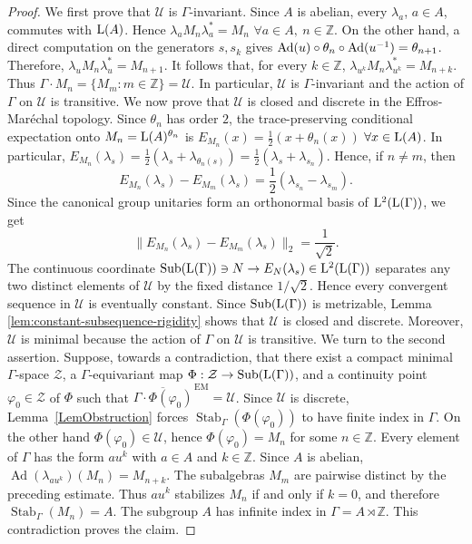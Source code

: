 \documentclass[12pt]{amsart} %
\theoremstyle{plain}
\theoremstyle{definition}
\newcommand{\Z}{\mathbb{Z}}
\newcommand{\LL}{{\rm L}}
\newcommand{\Ad}{{\rm Ad}}
\DeclareMathOperator{\Sub}{Sub}
\begin{document}
\begin{proof}
We first prove that \(\mathcal U\) is \(\Gamma\)-invariant. Since \(A\) is
abelian, every \(\lambda_a\), \(a\in A\), commutes with \({\rm L}(A)\). Hence $\lambda_a M_n\lambda_a^*=M_n$ $\forall a\in A,\ n\in\mathbb Z$.
On the other hand, {a direct computation on the generators
$s,s_k$ gives $\Ad(u)\circ\theta_n\circ\Ad(u^{-1})=\theta_{n+1}$.} Therefore, $\lambda_uM_n\lambda_u^*=M_{n+1}$. It follows that, for every \(k\in\mathbb Z\), $\lambda_{u^k}M_n\lambda_{u^k}^*=M_{n+k}$. Thus $\Gamma\cdot M_n=\{M_m:m\in\mathbb Z\}=\mathcal U$. In particular, \(\mathcal U\) is \(\Gamma\)-invariant and the action of
\(\Gamma\) on \(\mathcal U\) is transitive. We now prove that \(\mathcal U\) is closed and discrete in the Effros-Maréchal topology.
Since \(\theta_n\) has order \(2\), the trace-preserving conditional expectation
onto \(M_n={\rm L}(A)^{\theta_n}\) is $E_{M_n}(x)=\frac12(x+\theta_n(x))$ $\forall x\in{\rm L}(A)$. In particular, $E_{M_n}(\lambda_s)=\frac12(\lambda_s+\lambda_{\theta_n(s)})=\frac12(\lambda_s+\lambda_{s_n})$. Hence, if \(n\neq m\), then
$$E_{M_n}(\lambda_s)-E_{M_m}(\lambda_s)=\frac12(\lambda_{s_n}-\lambda_{s_m}).$$
Since the canonical group unitaries form an orthonormal basis of $\LL^2({\rm L}(\Gamma))$, we get
\[
        \bigl\|E_{M_n}(\lambda_s)-E_{M_m}(\lambda_s)\bigr\|_2
        =
        \frac{1}{\sqrt2}.
\]
{The continuous coordinate $
\Sub({\rm L}(\Gamma))\ni N\to E_N(\lambda_s)
\in\LL^2({\rm L}(\Gamma))$ separates any two distinct elements of $\mathcal U$ by the fixed distance
$1/\sqrt2$. Hence every convergent sequence in $\mathcal U$ is eventually
constant. Since $\Sub({\rm L}(\Gamma))$ is metrizable, Lemma \ref{lem:constant-subsequence-rigidity} shows that $\mathcal U$ is
closed and discrete. Moreover, $\mathcal U$ is minimal because the action
of $\Gamma$ on $\mathcal U$ is transitive.}
\noindent We turn to the second assertion. Suppose, towards a contradiction, that there exist a compact minimal \(\Gamma\)-space \(\mathcal Z\), a \(\Gamma\)-equivariant map \(\Phi:\mathcal Z\to\Sub({\rm L}(\Gamma))\), and a continuity point \(\varphi_0\in\mathcal Z\) of \(\Phi\) such that $\overline{\Gamma\cdot\Phi(\varphi_0)}^{\,\mathrm{EM}}=\mathcal U$. Since \(\mathcal U\) is discrete, Lemma~\ref{LemObstruction} forces $\operatorname{Stab}_\Gamma(\Phi(\varphi_0))$ to have finite index in \(\Gamma\). On the other hand $\Phi(\varphi_0)\in\mathcal U$, hence $\Phi(\varphi_0)=M_n$ for some \(n\in\mathbb Z\). {Every element of $\Gamma$ has the form $au^k$ with $a\in A$ and $k\in\mathbb Z$. Since $A$ is abelian, $\operatorname{Ad}(\lambda_{au^k})(M_n)=M_{n+k}$. The subalgebras $M_m$ are pairwise distinct by the preceding estimate.
Thus $au^k$ stabilizes $M_n$ if and only if $k=0$, and therefore $\operatorname{Stab}_\Gamma(M_n)=A$.} The subgroup $A$ has infinite index in \(\Gamma=A\rtimes\Z\). This contradiction proves the claim.
\end{proof}
\end{document}
